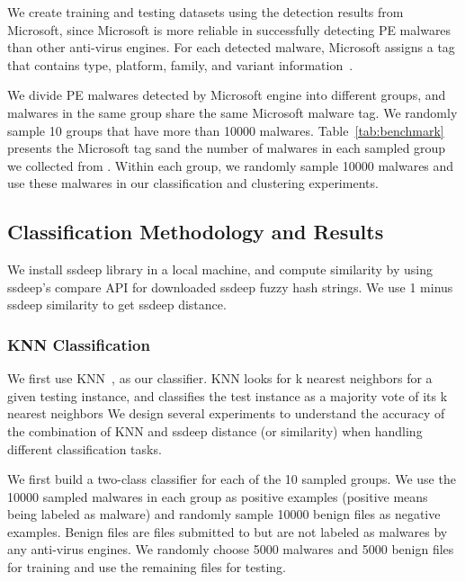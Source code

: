 We create training and testing
datasets using the detection results from Microsoft,
since Microsoft is more reliable in successfully detecting PE malwares~\cite{SongAPsys2016} than other anti-virus engines.
For each detected malware, 
Microsoft assigns a tag that contains type, platform, family, 
and variant information~\cite{microsoft}. 

We divide PE malwares detected by Microsoft engine into different groups, 
and malwares in the same group share the same Microsoft malware tag. 
We randomly sample 10 groups that have more than 10000 malwares.  
Table~\ref{tab:benchmark} presents the Microsoft tag sand the number of malwares in each sampled group we collected from \vt{}. 
Within each group, we randomly sample 10000 malwares and use these malwares in our classification and clustering experiments. 

\subsection{Classification Methodology and Results}
We install ssdeep library in a local machine, 
and compute similarity by using ssdeep's compare API for downloaded ssdeep fuzzy hash strings. 
We use 1 minus ssdeep similarity to get ssdeep distance.  

\subsubsection{KNN Classification}


We first use KNN~\cite{knn}, as our classifier. 
KNN looks for k nearest neighbors for a given testing instance, 
and classifies the test instance as a majority vote of its k nearest neighbors 
We design several experiments to understand the accuracy of 
the combination of KNN and ssdeep 
distance (or similarity) when handling different classification tasks. 

We first build a two-class classifier for each of the 10 sampled groups. 
We use the 10000 sampled malwares in each group as positive examples (positive means being labeled as malware)
and randomly sample 10000 benign files as negative examples. 
Benign files are files submitted to \vt{} but are not labeled as malwares by any anti-virus engines. 
We randomly choose 5000 malwares and 5000 benign files for training and use the remaining files for testing.

